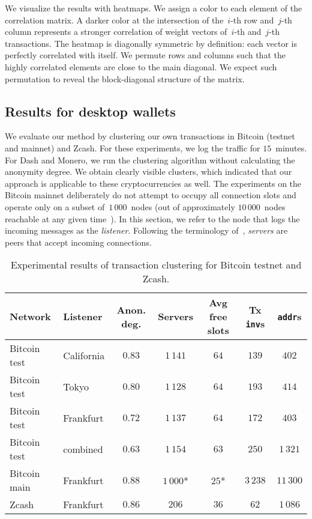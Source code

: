 We visualize the results with heatmaps.
We assign a color to each element of the correlation matrix.
A darker color at the intersection of the~$i$-th row and~$j$-th column represents a stronger correlation of weight vectors of~$i$-th and~$j$-th transactions.
The heatmap is diagonally symmetric by definition: each vector is perfectly correlated with itself.
We permute rows and columns such that the highly correlated elements are close to the main diagonal.
We expect such permutation to reveal the block-diagonal structure of the matrix.


\subsection{Results for desktop wallets}

We evaluate our method by clustering our own transactions in Bitcoin (testnet and mainnet) and Zcash.
For these experiments, we log the traffic for $15$~minutes.
For Dash and Monero, we run the clustering algorithm without calculating the anonymity degree.
We obtain clearly visible clusters, which indicated that our approach is applicable to these cryptocurrencies as well.
The experiments on the Bitcoin mainnet deliberately do not attempt to occupy all connection slots and operate only on a subset of~$1\,000$~nodes (out of approximately $10\,000$~nodes reachable at any given time~\cite{Bitnodes}).
In this section, we refer to the node that logs the incoming messages as the \textit{listener}.
Following the terminology of~\cite{Biryukov2014}, \textit{servers} are peers that accept incoming connections.

\begin{table*}[!t]
	\normalsize
	\caption{Experimental results of transaction clustering for Bitcoin testnet and Zcash.}
	\centering
	\begin{tabular}{|l|l|c|c|c|c|c|}
		\hline
		Network & Listener & Anon\@. deg. & Servers & Avg free slots & Tx \texttt{inv}s & \texttt{addr}s \\
		\hline
		Bitcoin test & California & $0.83$ & $1\,141$ & $64$ & $139$ & $402$ \\
		Bitcoin test & Tokyo & $0.80$ & $1\,128$ & $64$ & $193$ & $414$ \\
		Bitcoin test & Frankfurt & $0.72$ & $1\,137$ & $64$ & $172$ & $403$ \\
		Bitcoin test & combined & $0.63$ & $1\,154$ & $63$ & $250$ & $1\,321$ \\
		Bitcoin main & Frankfurt & $0.88$ & $1\,000$* & $25$* & $3\,238$ & $11\,300$ \\
		Zcash & Frankfurt & $0.86$ & $206$ & $36$ & $62$ & $1\,086$ \\
		\hline
	\end{tabular}
	\label{tab:results}
\end{table*}

